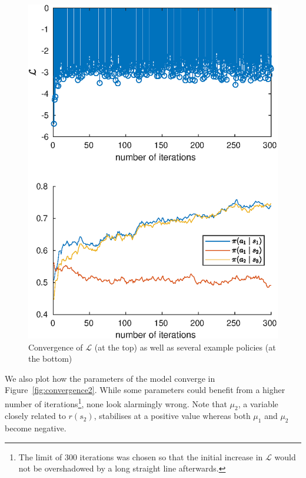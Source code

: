 \documentclass{mpaper}
\begin{document}
\begin{figure}
  \centering
  \includegraphics[width=\columnwidth]{figures/convergence_new}
  \caption{Convergence of $\mathcal{L}$ (at the top) as well as several example
    policies (at the bottom)}
  \label{fig:convergence1}
\end{figure}

We also plot how the parameters of the model converge in
Figure~\ref{fig:convergence2}. While some parameters could benefit from a higher
number of iterations\footnote{The limit of 300 iterations was chosen so that the
  initial increase in $\mathcal{L}$ would not be overshadowed by a long straight
  line afterwards.}, none look alarmingly wrong. Note that $\mu_2$, a variable
closely related to $r(s_2)$, stabilises at a positive value whereas both $\mu_1$
and $\mu_2$ become negative.
\end{document}
